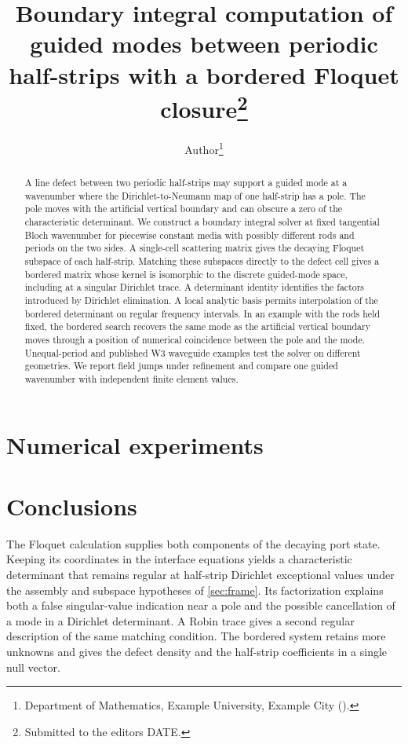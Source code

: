 \documentclass[review,hidelinks,onefignum,onetabnum]{siamart251216}
\title{Boundary integral computation of guided modes between periodic half-strips
  with a bordered Floquet closure\thanks{Submitted to the editors DATE.}}
\author{Author\thanks{Department of Mathematics, Example University, Example City
  (\email{author@example.com}).}}
\begin{document}
\maketitle

\begin{abstract}
A line defect between two periodic half-strips may support a guided mode at a
wavenumber where the Dirichlet-to-Neumann map of one half-strip has a pole.
The pole moves with the artificial vertical boundary and can obscure a zero
of the characteristic determinant. We construct a boundary integral solver
at fixed tangential Bloch wavenumber for piecewise constant media with
possibly different rods and periods on the two sides. A single-cell
scattering matrix gives the decaying Floquet subspace of each half-strip.
Matching these subspaces directly to the defect cell gives a bordered
matrix whose kernel is isomorphic to the discrete guided-mode space,
including at a singular Dirichlet trace. A determinant identity identifies
the factors introduced by Dirichlet elimination. A local analytic basis
permits interpolation of the bordered determinant on regular frequency
intervals. In an example with the rods held fixed, the bordered search
recovers the same mode as the artificial vertical boundary moves through
a position of numerical coincidence between the pole and the mode.
Unequal-period and published W3 waveguide examples test the solver on
different geometries. We report field jumps under refinement and compare
one guided wavenumber with independent finite element values.
\end{abstract}








\section{Numerical experiments}\label{sec:experiments}


\section{Conclusions}\label{sec:conclusion}
The Floquet calculation supplies both components of the decaying port state.
Keeping its coordinates in the interface equations yields a characteristic
determinant that remains regular at half-strip Dirichlet exceptional values
under the assembly and subspace hypotheses of \cref{sec:frame}. Its
factorization explains both a false singular-value indication near a pole
and the possible cancellation of a mode in a Dirichlet determinant.
A Robin trace gives a second regular description of the same matching
condition. The bordered system retains more unknowns and gives the defect
density and the half-strip coefficients in a single null vector.
\end{document}
